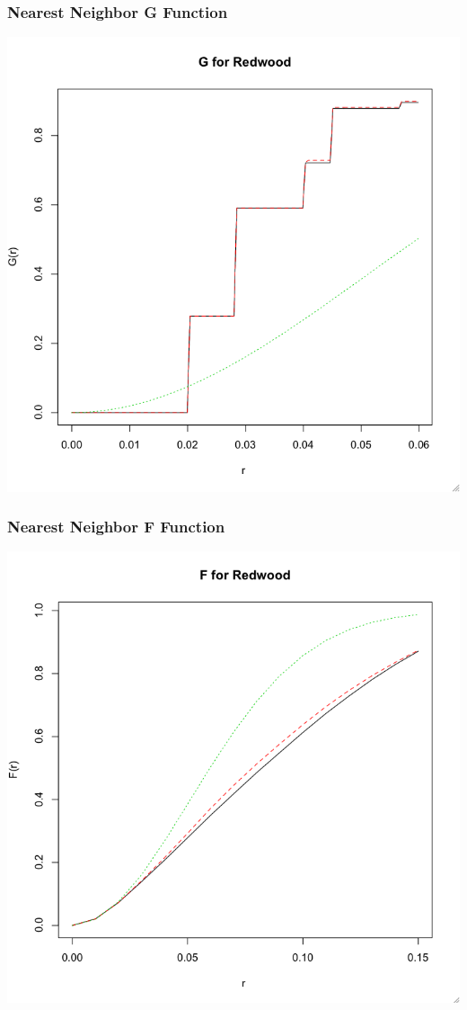 \documentclass[nototal,handout]{beamer}
\begin{document}
\begin{frame}[<+->]
    \frametitle{Nearest Neighbor G Function}
    \begin{center}
      \includegraphics[width=.65\linewidth]{gredwood.png}
    \end{center}
  \end{frame}

\begin{frame}[<+->]
    \frametitle{Nearest Neighbor F Function}
    \begin{center}
      \includegraphics[width=.65\linewidth]{fredwood.png}
    \end{center}
  \end{frame}
\end{document}
